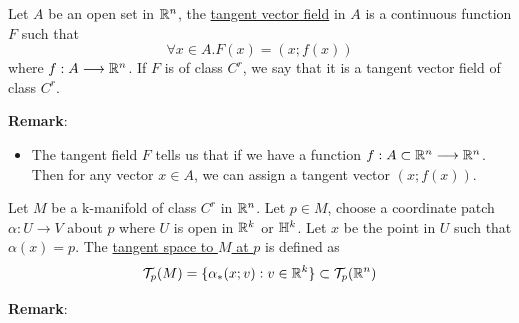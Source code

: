 \begin{definition}
    Let $A$ be an open set in $\mathbb{R}^n$, the \underline{tangent vector field} in $A$ is a continuous function $F$
    such that $$\forall x\in A. F(x)=(x;f(x))$$ where $f:A\longrightarrow\mathbb{R}^n$. If $F$ is of class $C^r$, we say that it is a tangent vector field of class $C^r$.
\end{definition}
\noindent\textbf{Remark}:
\begin{itemize}
    \item The tangent field $F$ tells us that if we have a function $f:A\subset\mathbb{R}^n\longrightarrow\mathbb{R}^n$. Then for any vector $x\in A$, we can assign a tangent vector $(x;f(x))$.
\end{itemize}

\begin{definition}
    Let $M$ be a k-manifold of class $C^r$ in $\mathbb{R}^n$. Let $p\in M$, choose a coordinate patch $\alpha:U\longrightarrow V$ about $p$ where $U$ is open in $\mathbb{R}^k$ or $\mathbb{H}^k$. 
    Let $x$ be the point in $U$ such that $\alpha(x)=p$. The \underline{tangent space to $M$ at $p$} is defined as $$\mathcal{T}_p(M)=\{\alpha_*(x;v):v\in \mathbb{R}^k\}\subset\mathcal{T}_p(\mathbb{R}^n)$$
\end{definition}
\noindent\textbf{Remark}:
